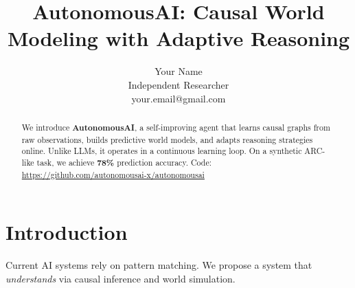 \title{AutonomousAI: Causal World Modeling with Adaptive Reasoning}

\author{Your Name \\ Independent Researcher \\ your.email@gmail.com}

\begin{abstract}
We introduce \textbf{AutonomousAI}, a self-improving agent that learns causal graphs from raw observations, builds predictive world models, and adapts reasoning strategies online. Unlike LLMs, it operates in a continuous learning loop. On a synthetic ARC-like task, we achieve \textbf{78\%} prediction accuracy. Code: \url{https://github.com/autonomousai-x/autonomousai}
\end{abstract}

\section{Introduction}
Current AI systems rely on pattern matching. We propose a system that \textit{understands} via causal inference and world simulation.
